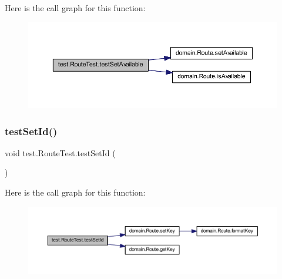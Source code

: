 Here is the call graph for this function\+:\nopagebreak
\begin{figure}[H]
\begin{center}
\leavevmode
\includegraphics[width=350pt]{classtest_1_1_route_test_a800664a2fbe5f7c806114a4a9e576529_cgraph}
\end{center}
\end{figure}
\mbox{\label{classtest_1_1_route_test_ab08c94959831d50b6350a697b55ca248}} 
\subsubsection{\texorpdfstring{test\+Set\+Id()}{testSetId()}}
{\footnotesize\ttfamily void test.\+Route\+Test.\+test\+Set\+Id (\begin{DoxyParamCaption}{ }\end{DoxyParamCaption})}

Here is the call graph for this function\+:\nopagebreak
\begin{figure}[H]
\begin{center}
\leavevmode
\includegraphics[width=350pt]{classtest_1_1_route_test_ab08c94959831d50b6350a697b55ca248_cgraph}
\end{center}
\end{figure}
\mbox{\label{classtest_1_1_route_test_ac1ec1e0a746b686d4e3c2ced9224b8d7}} 
